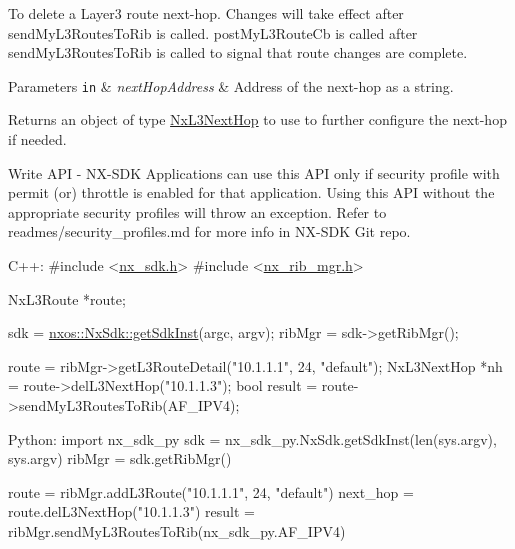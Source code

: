 To delete a Layer3 route next-\/hop. Changes will take effect after send\+My\+L3\+Routes\+To\+Rib is called. post\+My\+L3\+Route\+Cb is called after send\+My\+L3\+Routes\+To\+Rib is called to signal that route changes are complete.


\begin{DoxyParams}[1]{Parameters}
\mbox{\tt in}  & {\em next\+Hop\+Address} & Address of the next-\/hop as a string.\\
\hline
\end{DoxyParams}
\begin{DoxyReturn}{Returns}
an object of type \mbox{\hyperlink{classnxos_1_1_nx_l3_next_hop}{Nx\+L3\+Next\+Hop}} to use to further configure the next-\/hop if needed.
\end{DoxyReturn}
\begin{DoxyVerb}Write API - NX-SDK Applications can use this API only if security profile with permit (or) throttle is 
            enabled for that application. Using this API without the appropriate security profiles will
            throw an exception. Refer to readmes/security_profiles.md for more info in NX-SDK Git repo.
\end{DoxyVerb}
 
\begin{DoxyCode}
C++:
\textcolor{preprocessor}{     #include <\mbox{\hyperlink{nx__sdk_8h}{nx\_sdk.h}}>}
\textcolor{preprocessor}{     #include <\mbox{\hyperlink{nx__rib__mgr_8h}{nx\_rib\_mgr.h}}>}

     NxL3Route    *route;

     sdk = \mbox{\hyperlink{classnxos_1_1_nx_sdk_a5050e2d26c40744b4fc7862068a83f39}{nxos::NxSdk::getSdkInst}}(argc, argv);
     ribMgr = sdk->getRibMgr();

     route = ribMgr->getL3RouteDetail(\textcolor{stringliteral}{"10.1.1.1"}, 24, \textcolor{stringliteral}{"default"});
     NxL3NextHop *nh = route->delL3NextHop(\textcolor{stringliteral}{"10.1.1.3"});
     \textcolor{keywordtype}{bool} result = route->sendMyL3RoutesToRib(AF\_IPV4);

Python:
     \textcolor{keyword}{import} nx\_sdk\_py
     sdk = nx\_sdk\_py.NxSdk.getSdkInst(len(sys.argv), sys.argv)
     ribMgr = sdk.getRibMgr()

     route = ribMgr.addL3Route(\textcolor{stringliteral}{"10.1.1.1"}, 24, \textcolor{stringliteral}{"default"})
     next\_hop = route.delL3NextHop(\textcolor{stringliteral}{"10.1.1.3"})
     result = ribMgr.sendMyL3RoutesToRib(nx\_sdk\_py.AF\_IPV4)
\end{DoxyCode}



